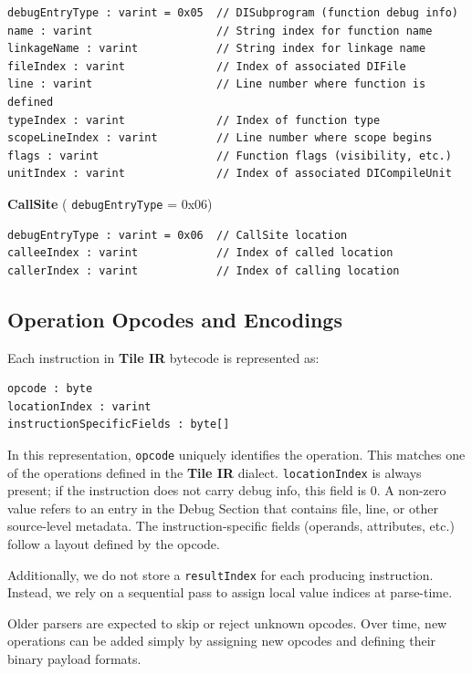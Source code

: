 \documentclass{article}
\begin{document}
\begin{lstlisting}
debugEntryType : varint = 0x05  // DISubprogram (function debug info)
name : varint                   // String index for function name
linkageName : varint            // String index for linkage name
fileIndex : varint              // Index of associated DIFile
line : varint                   // Line number where function is defined
typeIndex : varint              // Index of function type
scopeLineIndex : varint         // Line number where scope begins
flags : varint                  // Function flags (visibility, etc.)
unitIndex : varint              // Index of associated DICompileUnit
\end{lstlisting}

\textbf{CallSite} ( \texttt{debugEntryType} = 0x06)


\begin{lstlisting}
debugEntryType : varint = 0x06  // CallSite location
calleeIndex : varint            // Index of called location
callerIndex : varint            // Index of calling location
\end{lstlisting}



\subsection{Operation Opcodes and Encodings}

Each instruction in \textbf{Tile IR} bytecode is represented as:


\begin{lstlisting}
opcode : byte
locationIndex : varint
instructionSpecificFields : byte[]
\end{lstlisting}

In this representation, \texttt{opcode} uniquely identifies the operation. This matches one of the operations defined in the \textbf{Tile IR} dialect. \texttt{locationIndex} is always present; if the instruction does not carry debug info, this field is 0. A non-zero value refers to an entry in the Debug Section that contains file, line, or other source-level metadata. The instruction-specific fields (operands, attributes, etc.) follow a layout defined by the opcode.


Additionally, we do not store a \texttt{resultIndex} for each producing instruction. Instead, we rely on a sequential pass to assign local value indices at parse-time.


Older parsers are expected to skip or reject unknown opcodes. Over time, new operations can be added simply by assigning new opcodes and defining their binary payload formats.
\end{document}
